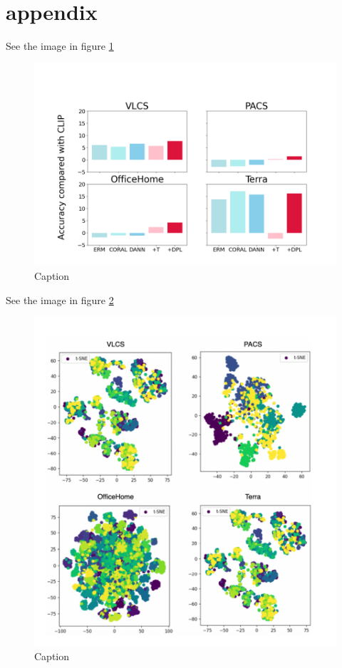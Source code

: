 \documentclass{article}
\begin{document}
\section{appendix}

See the image in figure \ref{fig:my_label4}
\begin{figure}
    \centering
    \includegraphics[width=0.95\linewidth]{figure4.jpg}
    \caption{Caption}
    \label{fig:my_label4}
\end{figure}

See the image in figure \ref{fig:my_label5}
\begin{figure}
    \centering
    \includegraphics[width=0.95\linewidth]{figure5.jpg}
    \caption{Caption}
    \label{fig:my_label5}
\end{figure}
\end{document}
